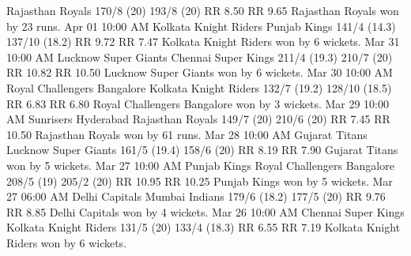 Rajasthan Royals
170/8 (20)
193/8 (20)
RR 8.50
RR 9.65
Rajasthan Royals won by 23 runs.
Apr 01
10:00 AM
Kolkata Knight Riders
Punjab Kings
141/4 (14.3)
137/10 (18.2)
RR 9.72
RR 7.47
Kolkata Knight Riders won by 6 wickets.
Mar 31
10:00 AM
Lucknow Super Giants
Chennai Super Kings
211/4 (19.3)
210/7 (20)
RR 10.82
RR 10.50
Lucknow Super Giants won by 6 wickets.
Mar 30
10:00 AM
Royal Challengers Bangalore
Kolkata Knight Riders
132/7 (19.2)
128/10 (18.5)
RR 6.83
RR 6.80
Royal Challengers Bangalore won by 3 wickets.
Mar 29
10:00 AM
Sunrisers Hyderabad
Rajasthan Royals
149/7 (20)
210/6 (20)
RR 7.45
RR 10.50
Rajasthan Royals won by 61 runs.
Mar 28
10:00 AM
Gujarat Titans
Lucknow Super Giants
161/5 (19.4)
158/6 (20)
RR 8.19
RR 7.90
Gujarat Titans won by 5 wickets.
Mar 27
10:00 AM
Punjab Kings
Royal Challengers Bangalore
208/5 (19)
205/2 (20)
RR 10.95
RR 10.25
Punjab Kings won by 5 wickets.
Mar 27
06:00 AM
Delhi Capitals
Mumbai Indians
179/6 (18.2)
177/5 (20)
RR 9.76
RR 8.85
Delhi Capitals won by 4 wickets.
Mar 26
10:00 AM
Chennai Super Kings
Kolkata Knight Riders
131/5 (20)
133/4 (18.3)
RR 6.55
RR 7.19
Kolkata Knight Riders won by 6 wickets.